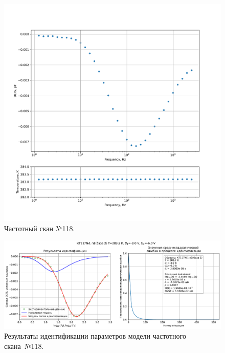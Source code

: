 \begin{figure}[!ht]
    \centering
    \includegraphics[width=1\textwidth]{../plots/КТ117№1_п1(база 2)_2500Гц-1Гц_1пФ_+10С_-3В-6В_100мВ_20мкс_шаг_0,1.pdf}
    \caption{Частотный скан №118.}
    \label{pic:frequency_scan_118}
\end{figure}

\begin{figure}[!ht]
    \centering
    \includegraphics[width=1\textwidth]{../plots/КТ117№1_п1(база 2)_2500Гц-1Гц_1пФ_+10С_-3В-6В_100мВ_20мкс_шаг_0,1_model.pdf}
    \caption{Результаты идентификации параметров модели частотного скана~№118.}
    \label{pic:frequency_scan_model118}
\end{figure}

\pagebreak


